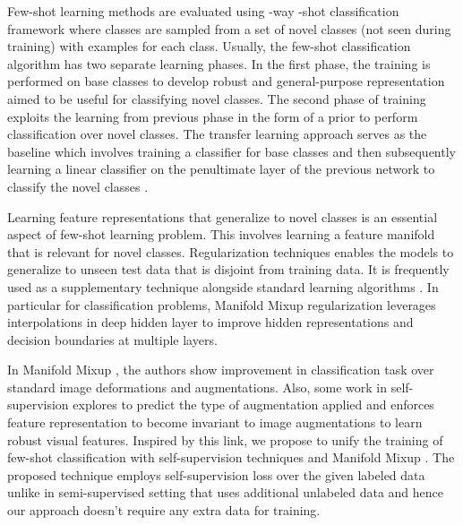 \documentclass[10pt,twocolumn,letterpaper]{article}
\begin{document}
Few-shot learning methods are evaluated using -way -shot classification framework where  classes are sampled from a set of novel classes (not seen during training) with  examples for each class.
Usually, the few-shot classification algorithm has two separate learning phases. In the first phase, the training is performed on base classes to develop robust and general-purpose representation aimed to be useful for classifying novel classes. The second phase of training exploits the learning from previous phase in the form of a prior to perform classification over novel classes. The transfer learning approach serves as the baseline which involves training a classifier for base classes and then subsequently learning a linear classifier on the penultimate layer of the previous network to classify the novel classes \cite{chen2019closerfewshot}. 




Learning feature representations that generalize to novel classes is an essential aspect of few-shot learning problem. This involves learning a feature manifold that is relevant for novel classes. Regularization techniques enables the models to generalize to unseen test data that is disjoint from training data. It is frequently used as a supplementary technique alongside standard learning algorithms \cite{bn_2015_generalize,drop_2012_generalize,bishop_1995_generalize,verma2019manifold,zhang2018mixup}.
In particular for classification problems, Manifold Mixup \cite{verma2019manifold} regularization leverages interpolations in deep hidden layer to improve hidden representations and decision boundaries at multiple layers.





In Manifold Mixup \cite{verma2019manifold}, the authors show improvement in classification task over standard image deformations and augmentations. Also, some work in self-supervision \cite{Spyros2018rotate,s4l2019,exemplar2014} explores to predict the type of augmentation applied and enforces feature representation to become invariant to image augmentations to learn robust visual features. Inspired by this link, we propose to unify the training of few-shot classification with self-supervision techniques and Manifold Mixup \cite{verma2019manifold}. The proposed technique employs self-supervision loss over the given labeled data unlike in semi-supervised setting that uses additional unlabeled data and hence our approach doesn't require any extra data for training.
\end{document}
